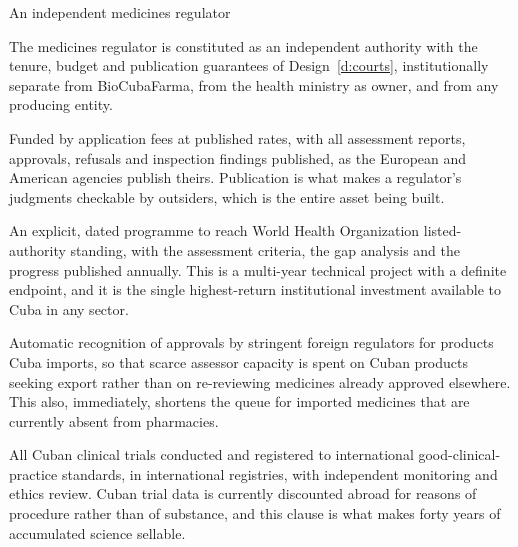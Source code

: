 \begin{design}{An independent medicines regulator}
\label{d:cecmed}
\begin{rules}
 The medicines regulator is constituted as an independent
authority with the tenure, budget and publication guarantees of
Design~\ref{d:courts}, institutionally separate from BioCubaFarma, from the
health ministry as owner, and from any producing entity.

 Funded by application fees at published rates,
with all assessment reports, approvals, refusals and inspection findings
published, as the European and American agencies publish theirs. Publication is
what makes a regulator's judgments checkable by outsiders, which is the entire
asset being built.

 An explicit, dated programme to reach
World Health Organization listed-authority standing, with the assessment
criteria, the gap analysis and the progress published annually. This is a
multi-year technical project with a definite endpoint, and it is the single
highest-return institutional investment available to Cuba in any sector.

 Automatic recognition of approvals by stringent
foreign regulators for products Cuba imports, so that scarce assessor capacity is
spent on Cuban products seeking export rather than on re-reviewing medicines
already approved elsewhere. This also, immediately, shortens the queue for
imported medicines that are currently absent from pharmacies.

 All Cuban clinical trials conducted and
registered to international good-clinical-practice standards, in international
registries, with independent monitoring and ethics review. Cuban trial data is
currently discounted abroad for reasons of procedure rather than of substance,
and this clause is what makes forty years of accumulated science sellable.
\end{rules}
\end{design}

